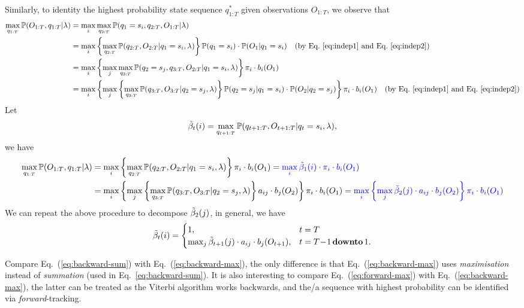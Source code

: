 Similarly, to identity the highest probability state sequence $q_{1:T}^*$ given observations $O_{1:T}$, 
we observe that 
\begin{align*}
\max_{q_{1:T}} \mathbb{P}(O_{1:T}, q_{1:T} |\lambda) 
&= \max_{i} \max_{q_{2:T}} \mathbb{P}(q_1 = s_i, q_{2:T}, O_{1:T} |\lambda) \\
&= \max_{i} \left\{ \max_{q_{2:T}} \mathbb{P}(q_{2:T}, O_{2:T} |q_1 = s_i, \lambda) \right\} \mathbb{P}(q_1 = s_i) \cdot \mathbb{P}(O_1 |q_1 = s_i) 
   ~~~ \text{(by Eq.~\ref{eq:indep1} and Eq.~\ref{eq:indep2})} \\
&= \max_{i} \left\{ \max_{j} \max_{q_{3:T}} \mathbb{P}(q_2 = s_j, q_{3:T}, O_{2:T} |q_1 = s_i, \lambda) \right\} \pi_i \cdot b_i(O_1) \\
&= \max_{i} \left\{ \max_{j} \left\{ \max_{q_{3:T}} \mathbb{P}(q_{3:T}, O_{3:T} |q_2 = s_j, \lambda) \right\} \mathbb{P}(q_2 = s_j |q_1 = s_i) \cdot \mathbb{P}(O_2 |q_2 = s_j) 
   \right\} \pi_i \cdot b_i(O_1) 
   ~~~ \text{(by Eq.~\ref{eq:indep1} and Eq.~\ref{eq:indep2})}
\end{align*}
Let 
\begin{equation}
\label{eq:betat}
\tilde{\beta}_t(i) = \max_{q_{t+1:T}} \mathbb{P}(q_{t+1:T}, O_{t+1:T} |q_t = s_i, \lambda),
\end{equation}
we have
\begin{align*}
\max_{q_{1:T}} \mathbb{P}(O_{1:T}, q_{1:T} |\lambda) 
&= \max_{i} \left\{ \max_{q_{2:T}} \mathbb{P}(q_{2:T}, O_{2:T} |q_1 = s_i, \lambda) \right\} \pi_i \cdot b_i(O_1) 
 = {\color{blue}{\max_{i} \tilde{\beta}_1(i) \cdot \pi_i \cdot b_i(O_1)}} \\
&= \max_{i} \left\{ \max_{j} \left\{ \max_{q_{3:T}} \mathbb{P}(q_{3:T}, O_{3:T} |q_2 = s_j, \lambda) \right\} a_{ij} \cdot b_j(O_2) \right\} \pi_i \cdot b_i(O_1) 
 = {\color{blue}{\max_{i} \left\{ \max_{j} \tilde{\beta}_2(j) \cdot a_{ij} \cdot b_j(O_2) \right\} \pi_i \cdot b_i(O_1)}}  \nonumber
\end{align*}
We can repeat the above procedure to decompose $\tilde{\beta}_2(j)$, in general, we have
\begin{equation}
\label{eq:backward-max}
\tilde{\beta}_t(i) = \begin{cases}
              1, & t=T \\
              \max_{j} \tilde{\beta}_{t+1}(j) \cdot a_{ij} \cdot b_j(O_{t+1}), & t=T\!-\!1 \,\textbf{downto}\, 1.
             \end{cases}
\end{equation}

Compare Eq.~(\ref{eq:backward-sum}) with Eq.~(\ref{eq:backward-max}), 
the only difference is that Eq.~(\ref{eq:backward-max}) uses \emph{maximisation} instead of \emph{summation} (used in Eq.~\ref{eq:backward-sum}).
It is also interesting to compare Eq.~(\ref{eq:forward-max}) with Eq.~(\ref{eq:backward-max}), 
the latter can be treated as the Viterbi algorithm works backwards, 
and the/a sequence with highest probability can be identified via \emph{forward}-tracking.


